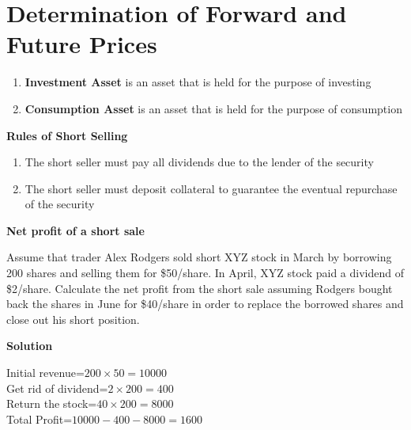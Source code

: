 \documentclass[11pt,fleqn]{report} %
\numberwithin{equation}{section} %
\numberwithin{figure}{section} %
\numberwithin{table}{section} %
\begin{document}
\chapter{Determination of Forward and Future Prices}
\begin{definition}
\begin{enumerate}
    \item \textbf{Investment Asset} is an asset that is held for the purpose of investing
    \item \textbf{Consumption Asset} is an asset that is held for the purpose of consumption
\end{enumerate}
\end{definition}
\begin{definition}\textbf{Rules of Short Selling}
\begin{enumerate}
    \item The short seller must pay all dividends due to the lender of the security
    \item The short seller must deposit collateral to guarantee the eventual repurchase of the security
\end{enumerate}
\end{definition}
\begin{exercise}\textbf{Net profit of a short sale}

Assume that trader Alex Rodgers sold short XYZ stock in March by borrowing 200
shares and selling them for \$50/share. In April, XYZ stock paid a dividend of \$2/share.
Calculate the net profit from the short sale assuming Rodgers bought back the shares
in June for \$40/share in order to replace the borrowed shares and close out his short position.

\textbf{Solution}

Initial revenue=$200\times 50=10000$\\
Get rid of dividend=$2\times 200=400$\\
Return the stock=$40\times 200=8000$\\
Total Profit=$10000-400-8000=1600$
\end{exercise}
\end{document}
